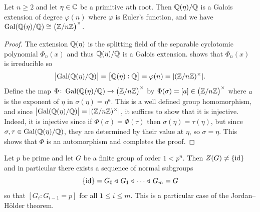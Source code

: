 \documentclass[11pt,a4paper]{article}
\begin{document}
\begin{corollary}
  Let $n \geq 2$ and let $\eta \in \mathbb{C}$ be a primitive $n$th root.
  Then $\mathbb{Q}(\eta)/\mathbb{Q}$ is a Galois extension of degree $\varphi(n)$
  where $\varphi$ is Euler's function,
  and we have $\Gal(\Q(\eta)/\Q) \cong \del{\Z/n\Z}^{\times}$.
\end{corollary}
\begin{proof}
  The extension $\mathbb{Q}(\eta)$ is the splitting field of the separable
  cyclotomic
  polynomial $\Phi_n(x)$ and thus $\mathbb{Q}(\eta)/\mathbb{Q}$ is a Galois extension.
  shows that $\Phi_n(x)$ is irreducible so
  \[
    \left\lvert\operatorname{Gal}(\mathbb{Q}(\eta)/\mathbb{Q})\right\rvert = \left[\mathbb{Q}(\eta) : \mathbb{Q}\right] = \varphi(n) = 
    |(\mathbb{Z}/n\mathbb{Z})^{\times}|.
  \]
  Define the map $\Phi \colon \Gal(\Q(\eta)/\Q) \to \del{\Z/n\Z}^{\times}$
  by $\Phi(\sigma) = [a] \in \del{\Z/n\Z}^{\times}$
  where $a$ is the exponent of $\eta$ in $\sigma(\eta) = \eta^a$.
  This is a well defined group homomorphism,
  and since $\left\lvert\operatorname{Gal}(\mathbb{Q}(\eta)/\mathbb{Q})\right\rvert = |(\mathbb{Z}/n\mathbb{Z})^{\times}|$,
  it suffices to show that it is injective.
  Indeed, it is injective since if $\Phi(\sigma) = \Phi(\tau)$
  then $\sigma(\eta) = \tau(\eta)$,
  but since $\sigma,\tau \in \operatorname{Gal}(\mathbb{Q}(\eta)/\mathbb{Q})$,
  they are determined by their value at $\eta$,
  so $\sigma = \eta$.
  This shows that $\Phi$ is an automorphism and completes the proof.
\end{proof}

\begin{remark}
  \label{rmk:gauss-wantzel}
  Let $p$ be prime and let $G$ be a finite group of order $1 < p^n$.
  Then $Z(G) \neq \left\{\operatorname{id}\right\}$ and in particular there exists
  a sequence of normal subgroups
  \[
    \left\{\operatorname{id}\right\} = G_0 \triangleleft\, G_1 \triangleleft\, \cdots \triangleleft\, G_m = G
  \]
  so that $[G_i : G_{i-1} = p]$ for all $1 \le i \le m$.
  This is a particular case of the Jordan--H\"older theorem.
\end{remark}
\end{document}
